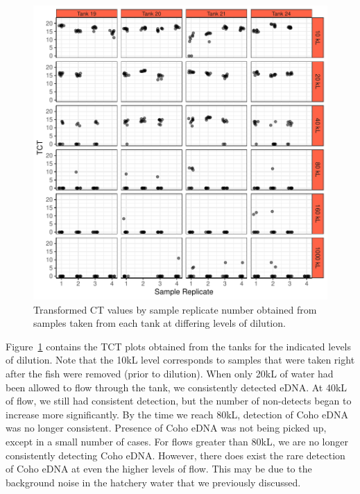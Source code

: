\begin{figure}[H]
\includegraphics{Chapter4Images/finalflowplots.pdf}
\caption{Transformed CT values by sample replicate number obtained from samples taken from each tank at differing levels of dilution.}
\label{fig:finalflowplot}
\end{figure}





Figure~\ref{fig:finalflowplot} contains the TCT plots obtained from the tanks for the indicated levels of dilution. Note that the 10kL level corresponds to samples that were taken right after the fish were removed (prior to dilution). When only 20kL of water had been allowed to flow through the tank, we consistently detected eDNA. At 40kL of flow, we still had consistent detection, but the number of non-detects began to increase more significantly. By the time we reach 80kL, detection of Coho eDNA was no longer consistent. Presence of Coho eDNA was not being picked up, except in a small number of cases. For flows greater than 80kL, we are no longer consistently detecting Coho eDNA. However, there does exist the rare detection of Coho eDNA at even the higher levels of flow. This may be due to the background noise in the hatchery water that we previously discussed.


